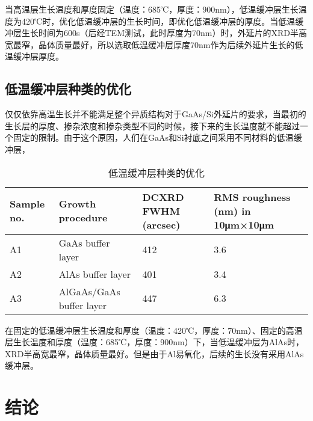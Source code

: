 当高温层生长温度和厚度固定（温度：685℃，厚度：900nm），低温缓冲层生长温度为420℃时，优化低温缓冲层的生长时间，即优化低温缓冲层的厚度。当低温缓冲层生长时间为600s（后经TEM测试，此时厚度为70nm）时，外延片的XRD半高宽最窄，晶体质量最好，所以选取低温缓冲层厚度70nm作为后续外延片生长的低温缓冲层厚度。


\subsection{低温缓冲层种类的优化}

仅仅依靠高温生长并不能满足整个异质结构对于GaAs/Si外延片的要求，当最初的生长层的厚度、掺杂浓度和掺杂类型不同的时候，接下来的生长温度就不能超过一个固定的限制。由于这个原因，人们在GaAs和Si衬底之间采用不同材料的低温缓冲层，

\begin{table*}[htbp] 
	\centering
	\caption{\label{tab:test3}低温缓冲层种类的优化}  
	\begin{tabular}{m{}<{\centering}m{}<{\centering}m{}<{\centering}m{}<{\centering}}   
		\toprule
			Sample no. & Growth procedure & DCXRD FWHM (arcsec) & RMS roughness (nm) in 10μm×10μm \\
		\midrule
			A1 & GaAs buffer layer & 412 & 3.6 \\
			A2 & AlAs buffer layer & 401 & 3.4 \\
			A3 & AlGaAs/GaAs buffer layer & 447 & 6.3 \\
		\bottomrule
	\end{tabular}
\end{table*}

在固定的低温缓冲层生长温度和厚度（温度：420℃，厚度：70nm）、固定的高温层生长温度和厚度（温度：685℃，厚度：900nm）下，当低温缓冲层为AlAs时，XRD半高宽最窄，晶体质量最好。但是由于Al易氧化，后续的生长没有采用AlAs缓冲层。

\section{结论}

\ifx\usechapbib\empty


\fi

